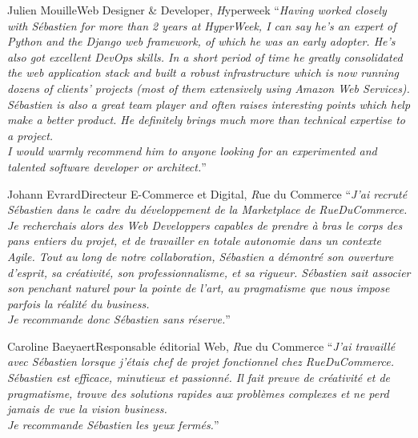 \documentclass[]{friggeri}
\begin{document}
\begin{quoting}{Julien Mouille}{Web Designer \& Developer, {\emph Hyperweek}}
``\textit{Having worked closely with Sébastien for more than 2 years at
HyperWeek, I can say he's an expert of Python and the Django web framework, of
which he was an early adopter. He's also got excellent DevOps skills. In a
short period of time he greatly consolidated the web application stack and
built a robust infrastructure which is now running dozens of clients' projects
(most of them extensively using Amazon Web Services).\\
Sébastien is also a great team player and often raises interesting points
which help make a better product. He definitely brings much more than
technical expertise to a project.\\
I would warmly recommend him to anyone looking for an experimented and
talented software developer or architect.}''
\end{quoting}

\begin{quoting}{Johann Evrard}{Directeur E-Commerce et Digital, {\emph Rue du Commerce}}
``\textit{J'ai recruté Sébastien dans le cadre du développement de la
Marketplace de RueDuCommerce. Je recherchais alors des Web Developpers
capables de prendre à bras le corps des pans entiers du projet, et de
travailler en totale autonomie dans un contexte Agile.
Tout au long de notre collaboration, Sébastien a démontré son ouverture
d'esprit, sa créativité, son professionnalisme, et sa rigueur. Sébastien sait
associer son penchant naturel pour la pointe de l'art, au pragmatisme que nous
impose parfois la réalité du business.\\
Je recommande donc Sébastien sans réserve.}''
\end{quoting}

\begin{quoting}{Caroline Baeyaert}{Responsable éditorial Web, {\emph Rue du Commerce}}
``\textit{J'ai travaillé avec Sébastien lorsque j'étais chef de projet fonctionnel
chez RueDuCommerce. Sébastien est efficace, minutieux et passionné. Il fait
preuve de créativité et de pragmatisme, trouve des solutions rapides aux
problèmes complexes et ne perd jamais de vue la vision business.\\
Je recommande Sébastien les yeux fermés.}''
\end{quoting}
\end{document}

